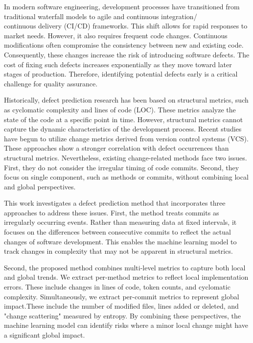 In modern software engineering, development processes have transitioned from traditional waterfall models to agile and continuous integration/\\continuous delivery (CI/CD) frameworks. This shift allows for rapid responses to market needs. However, it also requires frequent code changes. Continuous modifications often compromise the consistency between new and existing code. Consequently, these changes increase the risk of introducing software defects. The cost of fixing such defects increases exponentially as they move toward later stages of production. Therefore, identifying potential defects early is a critical challenge for quality assurance.

Historically, defect prediction research has been based on structural metrics, such as cyclomatic complexity and lines of code (LOC). These metrics analyze the state of the code at a specific point in time. However, structural metrics cannot capture the dynamic characteristics of the development process. Recent studies have begun to utilize change metrics derived from version control systems (VCS). These approaches show a stronger correlation with defect occurrences than structural metrics. Nevertheless, existing change-related methods face two issues. First, they do not consider the irregular timing of code commits. Second, they focus on single component, such as methods or commits, without combining local and global perspectives.

This work investigates a defect prediction method that incorporates three approaches to address these issues. First, the method treats commits as irregularly occurring events. Rather than measuring data at fixed intervals, it focuses on the differences between consecutive commits to reflect the actual changes of software development. This enables the machine learning model to track changes in complexity that may not be apparent in structural metrics.

Second, the proposed method combines multi-level metrics to capture both local and global trends. We extract per-method metrics to reflect local implementation errors. These include changes in lines of code, token counts, and cyclomatic complexity. Simultaneously, we extract per-commit metrics to represent global impact.These include the number of modified files, lines added or deleted, and "change scattering" measured by entropy. By combining these perspectives, the machine learning model can identify risks where a minor local change might have a significant global impact.

